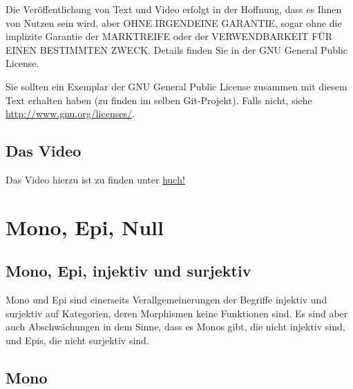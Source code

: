 \documentclass[a4paper]{amsart}
\theoremstyle{definition}
\begin{document}
Die Veröffentlichung von Text und Video erfolgt in der Hoffnung, dass es Ihnen von Nutzen sein wird, 
aber OHNE IRGENDEINE GARANTIE, sogar ohne die implizite Garantie der MARKTREIFE oder der 
VERWENDBARKEIT FÜR EINEN BESTIMMTEN ZWECK. Details finden Sie in der GNU General Public License.

Sie sollten ein Exemplar der GNU General Public License zusammen mit diesem Text erhalten haben 
(zu finden im selben Git-Projekt). 
Falls nicht, siehe \url{http://www.gnu.org/licenses/}.

\subsection*{Das Video}
Das Video hierzu ist zu finden unter 
{\tiny
   \url{huch!}
}

\section{Mono, Epi, Null}

\subsection{Mono, Epi, injektiv und surjektiv}
Mono und Epi sind einerseits Verallgemeinerungen der Begriffe injektiv und surjektiv auf Kategorien, deren Morphismen keine Funktionen sind. Es sind aber auch Abschwächungen in dem Sinne, dass es Monos gibt, die nicht injektiv sind, und Epis, die nicht surjektiv sind.

\subsection{Mono}
\end{document}

